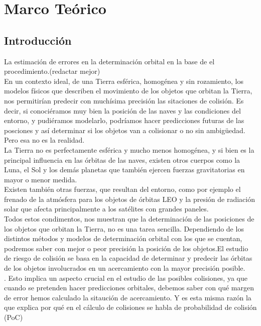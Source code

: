 \chapter{Marco Teórico}
\label{chap:marcoteorico}

\section{Introducci\'on}

La estimaci\'on de errores en la determinaci\'on orbital en la base de el procedimiento.(redactar mejor)\\
En un contexto ideal, de una Tierra esf\'erica, homog\'enea y sin rozamiento, los modelos f\'isicos que describen el movimiento de los objetos que orbitan la Tierra, nos permitir\'ian predecir con much\'isima precisi\'on las sitaciones de colisi\'on. Es decir, si conoci\'eramos muy bien la posici\'on de las naves y las condiciones del entorno, y pudi\'eramos modelarlo, podr\'iamos hacer predicciones futuras de las posciones y as\'i determinar si los objetos van a colisionar o no sin ambig\"uedad. Pero esa no es la realidad.\\
La Tierra no es perfectamente esf\'erica y mucho menos homog\'enea, y si bien es la principal influencia en las \'orbitas de las naves, existen otros cuerpos como la Luna, el Sol y los dem\'as planetas que tambi\'en ejercen fuerzas gravitatorias en mayor o menor medida.\\
Existen tambi\'en otras fuerzas, que resultan del entorno, como por ejemplo el frenado de la atm\'osfera para los objetos de \'orbitas LEO y la presi\'on de radiaci\'on solar que afecta principalmente a los sat\'elites con grandes paneles.\\

Todos estos condimentos, nos muestran que la determinaci\'on de las posiciones de los objetos que orbitan la Tierra, no es una tarea sencilla. Dependiendo de los distintos m\'etodos y modelos de determinaci\'on orbital con los que se cuentan, podremos saber con mejor o peor precisi\'on la posici\'on de los objetos.El estudio de riesgo de colisi\'on se basa en la capacidad de determinar y predecir las \'orbitas de los objetos involucrados en un acercamiento con la mayor precisi\'on posible.\\.
Esto implica un aspecto crucial en el estudio de las posibles colisiones, ya que cuando se pretenden hacer predicciones orbitales, debemos saber con qu\'e margen de error hemos calculado la sitauci\'on de acercamiento. Y es esta misma raz\'on la que explica por qu\'e en el c\'alculo de colisiones se habla de probabilidad de colisi\'on (PoC)\\

